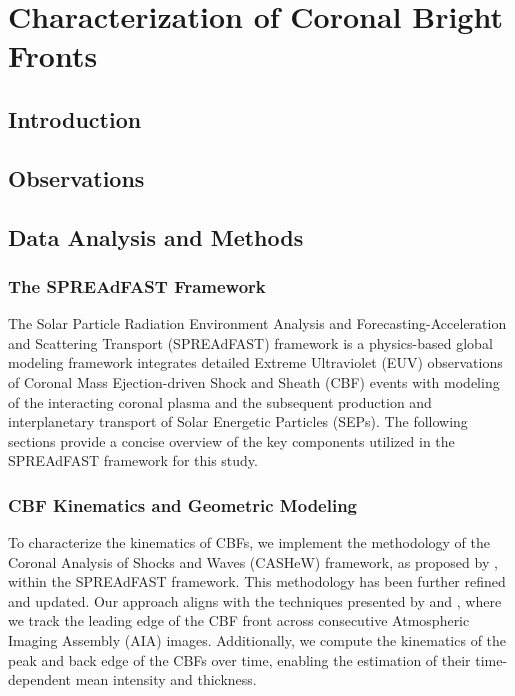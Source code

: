 \chapter{Characterization of Coronal Bright Fronts}
\label{chapter2}

\section{Introduction}

\section{Observations}

\section{Data Analysis and Methods}

\subsection{The SPREAdFAST Framework}
The Solar Particle Radiation Environment Analysis and Forecasting-Acceleration and Scattering Transport (SPREAdFAST) framework is a physics-based global modeling framework integrates detailed Extreme Ultraviolet (EUV) observations of Coronal Mass Ejection-driven Shock and Sheath (CBF) events with modeling of the interacting coronal plasma and the subsequent production and interplanetary transport of Solar Energetic Particles (SEPs). The following sections provide a concise overview of the key components utilized in the SPREAdFAST framework for this study.

\subsection{CBF Kinematics and Geometric Modeling}
To characterize the kinematics of CBFs, we implement the methodology of the Coronal Analysis of Shocks and Waves (CASHeW) framework, as proposed by \citet{kozarev_2017}, within the SPREAdFAST framework. This methodology has been further refined and updated. Our approach aligns with the techniques presented by \citet{long_2021} and \citet{downs_2021}, where we track the leading edge of the CBF front across consecutive Atmospheric Imaging Assembly (AIA) images. Additionally, we compute the kinematics of the peak and back edge of the CBFs over time, enabling the estimation of their time-dependent mean intensity and thickness.

